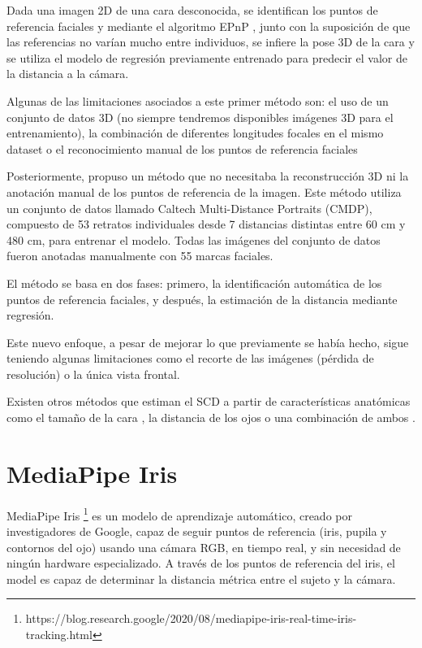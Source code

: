 Dada una imagen 2D de una cara desconocida, se identifican los puntos de referencia faciales y mediante el algoritmo EPnP \cite{29}, junto con la suposición de que las referencias no varían mucho entre individuos, se infiere la pose 3D de la cara y se utiliza el modelo de regresión previamente entrenado para predecir el valor de la distancia a la cámara.

Algunas de las limitaciones asociados a este primer método son: el uso de un conjunto de datos 3D (no siempre tendremos disponibles imágenes 3D para el entrenamiento), la combinación de diferentes longitudes focales en el mismo dataset o el reconocimiento manual de los puntos de referencia faciales

Posteriormente, \cite{30} propuso un método que no necesitaba la reconstrucción 3D ni la anotación manual de los puntos de referencia de la imagen. Este método utiliza un conjunto de datos llamado Caltech Multi-Distance Portraits (CMDP), compuesto de 53 retratos individuales desde 7 distancias distintas entre 60 cm y 480 cm, para entrenar el modelo. Todas las imágenes del conjunto de datos fueron anotadas manualmente con 55 marcas faciales. 

El método se basa en dos fases: primero, la identificación automática de los puntos de referencia faciales, y después, la estimación de la distancia mediante regresión.

Este nuevo enfoque, a pesar de mejorar lo que previamente se había hecho, sigue teniendo algunas limitaciones como el recorte de las imágenes (pérdida de resolución) o la única vista frontal.

Existen otros métodos que estiman el SCD a partir de características anatómicas como el tamaño de la cara \cite{32}, la distancia de los ojos \cite{33} o una combinación de ambos \cite{34}.

\section{MediaPipe Iris}

MediaPipe Iris \footnote{https://blog.research.google/2020/08/mediapipe-iris-real-time-iris-tracking.html} es un modelo de aprendizaje automático, creado por investigadores de Google, capaz de seguir puntos de referencia (iris, pupila y contornos del ojo) usando una cámara RGB, en tiempo real, y sin necesidad de ningún hardware especializado. A través de los puntos de referencia del iris, el model es capaz de determinar la distancia métrica entre el sujeto y la cámara.

